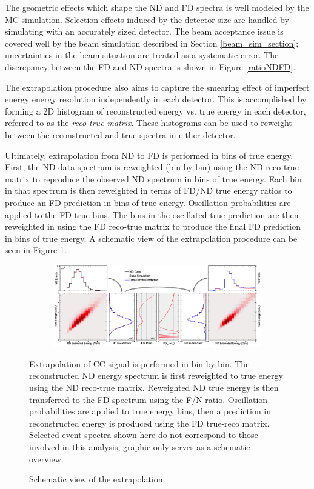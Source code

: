 The geometric effects which shape the ND and FD spectra is well modeled
by the MC simulation.
Selection effects induced by the detector size are handled by simulating
with an accurately sized detector.
The beam acceptance issue is covered well by the beam simulation described in
Section \ref{beam_sim_section}; uncertainties in the beam situation are
treated as a systematic error.
The discrepancy between the FD and ND spectra is shown in Figure
\ref{ratioNDFD}.


The extrapolation procedure also aims to capture the smearing effect of
imperfect energy energy resolution independently in each detector.
This is accomplished by forming a 2D histogram of reconstructed energy
vs. true energy in each detector, referred to as the \textit{reco-true matrix}.
These histograms can be used to reweight between the reconstructed
and true spectra in either detector.

Ultimately, extrapolation from ND to FD is performed in bins of true energy.
First, the ND data spectrum is reweighted (bin-by-bin)
using the ND reco-true matrix
to reproduce the observed ND spectrum in bins of true energy.
Each bin in that spectrum is then reweighted in terms of FD/ND true energy
ratios to
produce an FD prediction in bins of true energy.
Oscillation probabilities are applied to the FD true bins.
The bins in the
oscillated true prediction are then reweighted in using the FD reco-true
matrix to produce the final FD prediction in bins of true energy.
A schematic view of the extrapolation procedure can be seen in Figure
\ref{extrap_fig}.

\begin{figure}
\begin{center}
  \begin{subfigure}[b]{\textwidth}
    \centering
    \includegraphics[height=0.45\textwidth, angle=-90]{figures/figures/extrap_schematic.png}
  \end{subfigure}
\end{center}
\caption{Schematic view of the extrapolation}{
Extrapolation of \numu CC signal is performed in bin-by-bin.
The reconstructed ND energy spectrum is first reweighted to true energy
using the ND reco-true matrix.
Reweighted ND true energy is then transferred to the FD spectrum using the
F/N ratio.
Oscillation probabilities are applied to true energy bins,
then a prediction in reconstructed energy is produced using the
FD true-reco matrix.
Selected event spectra shown here do not correspond to those
involved in this analysis, graphic only serves as a schematic overview.
}
\label{extrap_fig}
\end{figure}

